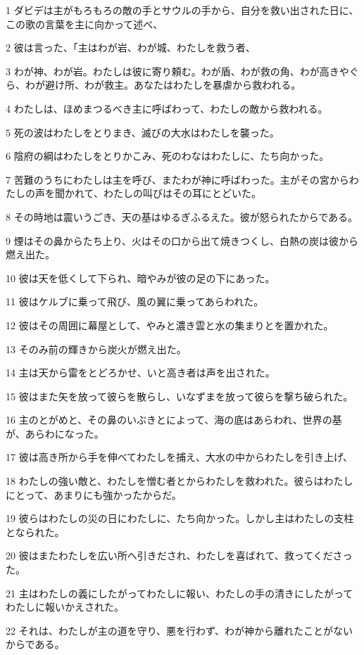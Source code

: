 \par 1 ダビデは主がもろもろの敵の手とサウルの手から、自分を救い出された日に、この歌の言葉を主に向かって述べ、
\par 2 彼は言った、「主はわが岩、わが城、わたしを救う者、
\par 3 わが神、わが岩。わたしは彼に寄り頼む。わが盾、わが救の角、わが高きやぐら、わが避け所、わが救主。あなたはわたしを暴虐から救われる。
\par 4 わたしは、ほめまつるべき主に呼ばわって、わたしの敵から救われる。
\par 5 死の波はわたしをとりまき、滅びの大水はわたしを襲った。
\par 6 陰府の綱はわたしをとりかこみ、死のわなはわたしに、たち向かった。
\par 7 苦難のうちにわたしは主を呼び、またわが神に呼ばわった。主がその宮からわたしの声を聞かれて、わたしの叫びはその耳にとどいた。
\par 8 その時地は震いうごき、天の基はゆるぎふるえた。彼が怒られたからである。
\par 9 煙はその鼻からたち上り、火はその口から出て焼きつくし、白熱の炭は彼から燃え出た。
\par 10 彼は天を低くして下られ、暗やみが彼の足の下にあった。
\par 11 彼はケルブに乗って飛び、風の翼に乗ってあらわれた。
\par 12 彼はその周囲に幕屋として、やみと濃き雲と水の集まりとを置かれた。
\par 13 そのみ前の輝きから炭火が燃え出た。
\par 14 主は天から雷をとどろかせ、いと高き者は声を出された。
\par 15 彼はまた矢を放って彼らを散らし、いなずまを放って彼らを撃ち破られた。
\par 16 主のとがめと、その鼻のいぶきとによって、海の底はあらわれ、世界の基が、あらわになった。
\par 17 彼は高き所から手を伸べてわたしを捕え、大水の中からわたしを引き上げ、
\par 18 わたしの強い敵と、わたしを憎む者とからわたしを救われた。彼らはわたしにとって、あまりにも強かったからだ。
\par 19 彼らはわたしの災の日にわたしに、たち向かった。しかし主はわたしの支柱となられた。
\par 20 彼はまたわたしを広い所へ引きだされ、わたしを喜ばれて、救ってくださった。
\par 21 主はわたしの義にしたがってわたしに報い、わたしの手の清きにしたがってわたしに報いかえされた。
\par 22 それは、わたしが主の道を守り、悪を行わず、わが神から離れたことがないからである。
